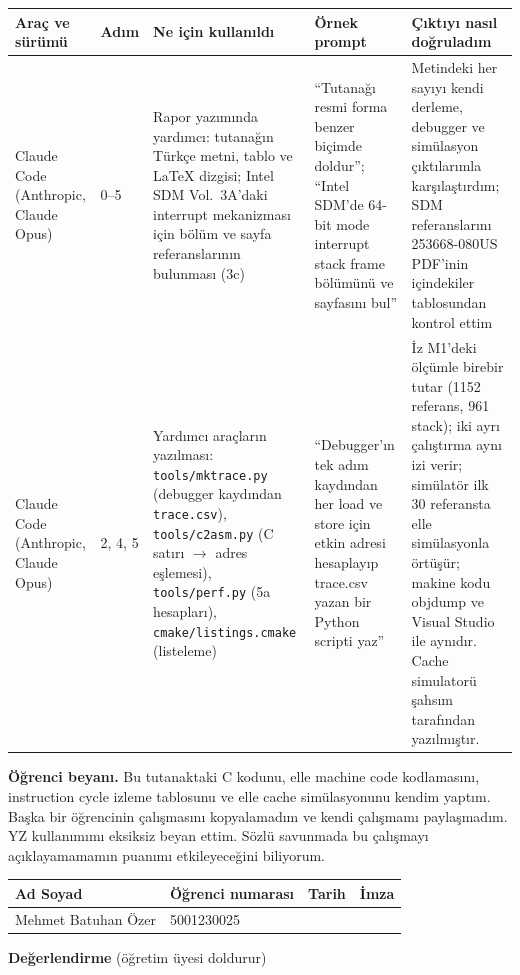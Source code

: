 \documentclass[11pt,a4paper]{article}
\newcommand{\tl}{\texttt}
\newcommand{\hd}[1]{\cellcolor{hdr}#1}
\begin{document}
\begin{longtable}{|p{2.8cm}|p{1.4cm}|p{3.6cm}|p{3.4cm}|p{3.8cm}|}
\hline
\hd{Araç ve sürümü} & \hd{Adım} & \hd{Ne için kullanıldı} & \hd{Örnek prompt} & \hd{Çıktıyı nasıl doğruladım}\\
\hline
Claude Code (Anthropic, Claude Opus) & 0--5 & Rapor yazımında yardımcı: tutanağın Türkçe metni, tablo ve LaTeX dizgisi; Intel SDM Vol.~3A'daki interrupt mekanizması için bölüm ve sayfa referanslarının bulunması (3c) & ``Tutanağı resmi forma benzer biçimde doldur''; ``Intel SDM'de 64-bit mode interrupt stack frame bölümünü ve sayfasını bul'' & Metindeki her sayıyı kendi derleme, debugger ve simülasyon çıktılarımla karşılaştırdım; SDM referanslarını 253668-080US PDF'inin içindekiler tablosundan kontrol ettim\\ \hline
Claude Code (Anthropic, Claude Opus) & 2, 4, 5 & Yardımcı araçların yazılması: \tl{tools/mktrace.py} (debugger kaydından \tl{trace.csv}), \tl{tools/c2asm.py} (C satırı $\to$ adres eşlemesi), \tl{tools/perf.py} (5a hesapları), \tl{cmake/listings.cmake} (listeleme) & ``Debugger'ın tek adım kaydından her load ve store için etkin adresi hesaplayıp trace.csv yazan bir Python scripti yaz'' & İz M1'deki ölçümle birebir tutar (1152 referans, 961 stack); iki ayrı çalıştırma aynı izi verir; simülatör ilk 30 referansta elle simülasyonla örtüşür; makine kodu objdump ve Visual Studio ile aynıdır. Cache simulatorü şahsım tarafından yazılmıştır.\\ \hline
\end{longtable}

\textbf{Öğrenci beyanı.} Bu tutanaktaki C kodunu, elle machine code kodlamasını, instruction cycle
izleme tablosunu ve elle cache simülasyonunu kendim yaptım. Başka bir öğrencinin çalışmasını
kopyalamadım ve kendi çalışmamı paylaşmadım. YZ kullanımımı eksiksiz beyan ettim. Sözlü savunmada
bu çalışmayı açıklayamamamın puanımı etkileyeceğini biliyorum.

\begin{longtable}{|p{4.4cm}|p{4.4cm}|p{3.0cm}|p{3.0cm}|}
\hline
\hd{Ad Soyad} & \hd{Öğrenci numarası} & \hd{Tarih} & \hd{İmza}\\
\hline
Mehmet Batuhan Özer & 5001230025 & & \\ \hline
\end{longtable}

\textbf{Değerlendirme} (öğretim üyesi doldurur)
\end{document}
